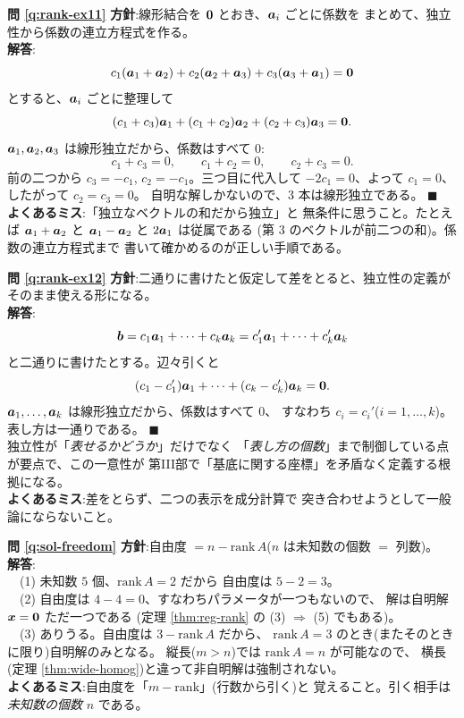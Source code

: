 \bigskip
\noindent\textbf{問 \ref{q:rank-ex11}}\quad
\textbf{方針}:線形結合を $\bm{0}$ とおき、$\bm{a}_i$ ごとに係数を
まとめて、独立性から係数の連立方程式を作る。\\
\textbf{解答}:
\[
c_1(\bm{a}_1 + \bm{a}_2) + c_2(\bm{a}_2 + \bm{a}_3)
+ c_3(\bm{a}_3 + \bm{a}_1) = \bm{0}
\]
とすると、$\bm{a}_i$ ごとに整理して
\[
(c_1 + c_3)\bm{a}_1 + (c_1 + c_2)\bm{a}_2 + (c_2 + c_3)\bm{a}_3
= \bm{0}.
\]
$\bm{a}_1, \bm{a}_2, \bm{a}_3$ は線形独立だから、係数はすべて $0$:
\[
c_1 + c_3 = 0, \qquad c_1 + c_2 = 0, \qquad c_2 + c_3 = 0.
\]
前の二つから $c_3 = -c_1$, $c_2 = -c_1$。三つ目に代入して
$-2c_1 = 0$、よって $c_1 = 0$、したがって $c_2 = c_3 = 0$。
自明な解しかないので、$3$ 本は線形独立である。 $\blacksquare$\\
\textbf{よくあるミス}:「独立なベクトルの和だから独立」と
無条件に思うこと。たとえば $\bm{a}_1 + \bm{a}_2$ と
$\bm{a}_1 - \bm{a}_2$ と $2\bm{a}_1$ は従属である
(第 $3$ のベクトルが前二つの和)。係数の連立方程式まで
書いて確かめるのが正しい手順である。

\bigskip
\noindent\textbf{問 \ref{q:rank-ex12}}\quad
\textbf{方針}:二通りに書けたと仮定して差をとると、独立性の定義が
そのまま使える形になる。\\
\textbf{解答}:
\[
\bm{b} = c_1\bm{a}_1 + \cdots + c_k\bm{a}_k
= c_1'\bm{a}_1 + \cdots + c_k'\bm{a}_k
\]
と二通りに書けたとする。辺々引くと
\[
(c_1 - c_1')\bm{a}_1 + \cdots + (c_k - c_k')\bm{a}_k = \bm{0}.
\]
$\bm{a}_1, \dots, \bm{a}_k$ は線形独立だから、係数はすべて $0$、
すなわち $c_i = c_i'$($i = 1, \dots, k$)。表し方は一通りである。
 $\blacksquare$\\
独立性が「\emph{表せるかどうか}」だけでなく
「\emph{表し方の個数}」まで制御している点が要点で、この一意性が
第III部で「基底に関する座標」を矛盾なく定義する根拠になる。\\
\textbf{よくあるミス}:差をとらず、二つの表示を成分計算で
突き合わせようとして一般論にならないこと。

\bigskip
\noindent\textbf{問 \ref{q:sol-freedom}}\quad
\textbf{方針}:自由度 $= n - \mathrm{rank}\,A$($n$ は未知数の個数
$=$ 列数)。\\
\textbf{解答}:\\
　(1) 未知数 $5$ 個、$\mathrm{rank}\,A = 2$ だから
自由度は $5 - 2 = 3$。\\
　(2) 自由度は $4 - 4 = 0$、すなわちパラメータが一つもないので、
解は自明解 $\bm{x} = \bm{0}$ ただ一つである
(定理 \ref{thm:reg-rank} の (3) $\Rightarrow$ (5) でもある)。\\
　(3) ありうる。自由度は $3 - \mathrm{rank}\,A$ だから、
$\mathrm{rank}\,A = 3$ のとき(またそのときに限り)自明解のみとなる。
縦長($m > n$)では $\mathrm{rank}\,A = n$ が可能なので、
横長(定理 \ref{thm:wide-homog})と違って非自明解は強制されない。\\
\textbf{よくあるミス}:自由度を「$m - \mathrm{rank}$」(行数から引く)と
覚えること。引く相手は\emph{未知数の個数} $n$ である。

